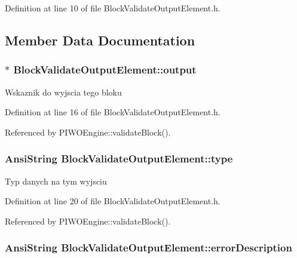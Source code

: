 Definition at line 10 of file BlockValidateOutputElement.h.

\subsection{Member Data Documentation}
\hypertarget{classBlockValidateOutputElement_6dba2211ec248d6b57551f067689b7e6}{
\subsubsection[output]{$\ast$ {\bf BlockValidateOutputElement::output}}}
\label{classBlockValidateOutputElement_6dba2211ec248d6b57551f067689b7e6}


Wskaznik do wyjscia tego bloku 

Definition at line 16 of file BlockValidateOutputElement.h.

Referenced by PIWOEngine::validateBlock().\hypertarget{classBlockValidateOutputElement_86efbb4dff759a82c0d7bf58889f7d54}{
\subsubsection[type]{\setlength{\rightskip}{0pt plus 5cm}AnsiString {\bf BlockValidateOutputElement::type}}}
\label{classBlockValidateOutputElement_86efbb4dff759a82c0d7bf58889f7d54}


Typ danych na tym wyjsciu 

Definition at line 20 of file BlockValidateOutputElement.h.

Referenced by PIWOEngine::validateBlock().\hypertarget{classBlockValidateOutputElement_d063a4632a943e2972bba2dd77a77d02}{
\subsubsection[errorDescription]{\setlength{\rightskip}{0pt plus 5cm}AnsiString {\bf BlockValidateOutputElement::errorDescription}}}
\label{classBlockValidateOutputElement_d063a4632a943e2972bba2dd77a77d02}



